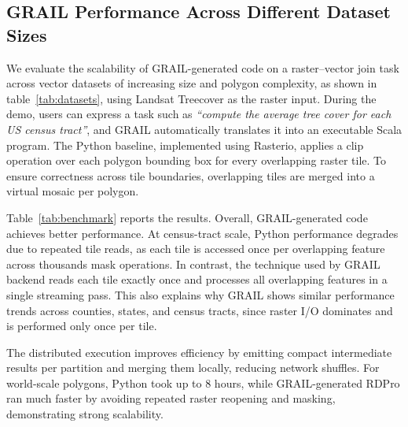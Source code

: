 \subsection{GRAIL Performance Across Different Dataset Sizes}



We evaluate the scalability of GRAIL-generated code on a raster–vector join task across vector datasets of increasing size and polygon complexity, as shown in table~\ref{tab:datasets}, using Landsat Treecover as the raster input. During the demo, users can express a task such as \textit{``compute the average tree cover for each US census tract''}, and GRAIL automatically translates it into an executable Scala program. The Python baseline, implemented using Rasterio, applies a clip operation over each polygon bounding box for every overlapping raster tile. To ensure correctness across tile boundaries, overlapping tiles are merged into a virtual mosaic per polygon. 

Table~\ref{tab:benchmark} reports the results. Overall, GRAIL-generated code achieves better performance. At census-tract scale, Python performance degrades due to repeated tile reads, as each tile is accessed once per overlapping feature across thousands mask operations. In contrast, the technique used by GRAIL backend reads each tile exactly once and processes all overlapping features in a single streaming pass. This also explains why GRAIL shows similar performance trends across counties, states, and census tracts, since raster I/O dominates and is performed only once per tile.

The distributed execution improves efficiency by emitting compact intermediate results per partition and merging them locally, reducing network shuffles. For world-scale polygons, Python took up to 8 hours, while GRAIL-generated RDPro ran much faster by avoiding repeated raster reopening and masking, demonstrating strong scalability.